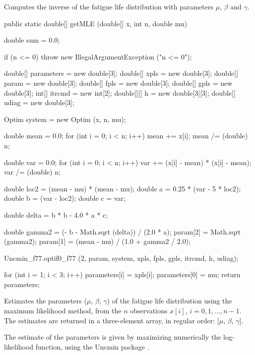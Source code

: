 \begin{tabb}
   Computes the inverse of the fatigue life distribution
   with parameters $\mu$, $\beta$ and $\gamma$.
 \end{tabb}
\begin{code}

   public static double[] getMLE (double[] x, int n, double mu)\begin{hide} {
      double sum = 0.0;
      
      if (n <= 0)
         throw new IllegalArgumentException ("n <= 0");

      double[] parameters = new double[3];
      double[] xpls = new double[3];
      double[] param = new double[3];
      double[] fpls = new double[3];
      double[] gpls = new double[3];
      int[] itrcmd = new int[2];
      double[][] h = new double[3][3];
      double[] udiag = new double[3];

      Optim system = new Optim (x, n, mu);

      double mean = 0.0;
      for (int i = 0; i < n; i++)
         mean += x[i];
      mean /= (double) n;

      double var = 0.0;
      for (int i = 0; i < n; i++)
         var += (x[i] - mean) * (x[i] - mean);
      var /= (double) n;

      double loc2 = (mean - mu) * (mean - mu);
      double a = 0.25 * (var - 5 * loc2);
      double b = (var - loc2);
      double c = var;

      double delta = b * b - 4.0 * a * c;

      double gamma2 = (- b - Math.sqrt (delta)) / (2.0 * a);
      param[2] = Math.sqrt (gamma2);
      param[1] = (mean - mu) / (1.0 + gamma2 / 2.0);

      Uncmin_f77.optif0_f77 (2, param, system, xpls, fpls, gpls, itrcmd, h, udiag);

      for (int i = 1; i < 3; i++)
         parameters[i] = xpls[i];
      parameters[0] = mu;
      return parameters;
   }\end{hide}
\end{code}
\begin{tabb}
   Estimates the parameters ($\mu$, $\beta$, $\gamma$) of the fatigue life
   distribution using the maximum likelihood method, from the $n$ observations
   $x[i]$, $i = 0, 1,\ldots, n-1$. The estimates are returned in a three-element
   array, in regular order: [$\mu$, $\beta$, $\gamma$]. 
   \begin{detailed}
   The estimate of the parameters is given by maximizing numerically the
   log-likelihood function, using the Uncmin package \cite{iSCHa,iVERa}.
   \end{detailed}
\end{tabb}

